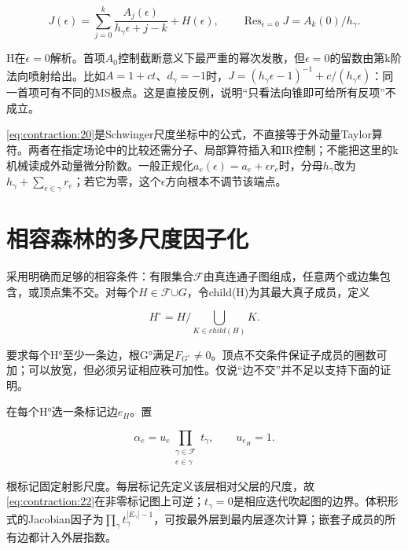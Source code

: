 \documentclass[11pt,a4paper,oneside]{ctexrep}
\theoremstyle{cnplain}
\theoremstyle{definition}
\theoremstyle{remark}
\begin{document}
\begin{equation}
J(\epsilon)=\sum_{j=0}^k\frac{A_j(\epsilon)}{h_\gamma\epsilon+j-k}
                  +H(\epsilon),\qquad
 \operatorname{Res}_{\epsilon=0}J=A_k(0)/h_\gamma.                \label{eq:contraction:20}
\end{equation}

H在\(\epsilon =0\)解析。首项\(A_0\)控制截断意义下最严重的幂次发散，但\(\epsilon =0\)的留数由第k阶法向喷射给出。比如\(A=1+c t\)、\(d_\gamma =- 1\)时，\(J=(h_\gamma \epsilon - 1)^{-1}+c/(h_\gamma \epsilon )\)：同一首项可有不同的MS极点。这是直接反例，说明``只看法向锥即可给所有反项''不成立。

\eqref{eq:contraction:20}是Schwinger尺度坐标中的公式，不直接等于外动量Taylor算符。两者在指定场论中的比较还需分子、局部算符插入和IR控制；不能把这里的k机械读成外动量微分阶数。一般正规化\(a_e(\epsilon )=a_e+\epsilon r_e\)时，分母\(h_\gamma \)改为\(h_\gamma +\sum _{e\in \gamma }r_e\)；若它为零，这个\(\epsilon \)方向根本不调节该端点。

\section{相容森林的多尺度因子化}\label{sec:contraction:6}

采用明确而足够的相容条件：有限集合\(\mathscr F\)由真连通子图组成，任意两个或边集包含，或顶点集不交。对每个\(H\in \)\(\mathscr F\)\(\cup {G}\)，令child(H)为其最大真子成员，定义

\begin{equation}
H^\circ=H/\bigcup_{K\in child(H)}K.      \label{eq:contraction:21}
\end{equation}

要求每个H°至少一条边，根G°满足\(F_{G^\circ}\ne 0\)。顶点不交条件保证子成员的圈数可加；可以放宽，但必须另证相应秩可加性。仅说``边不交''并不足以支持下面的证明。

在每个H°选一条标记边\(e_H\)。置

\begin{equation}
\alpha_e=u_e\prod_{\substack{\gamma\in\mathscr F\\e\in\gamma}}t_\gamma,
                  \qquad u_{e_H}=1.                             \label{eq:contraction:22}
\end{equation}

根标记固定射影尺度。每层标记先定义该层相对父层的尺度，故\eqref{eq:contraction:22}在非零标记图上可逆；\(t_\gamma =0\)是相应迭代吹起图的边界。体积形式的Jacobian因子为\(\prod _\gamma  t_\gamma ^{|E_\gamma |- 1}\)，可按最外层到最内层逐次计算；嵌套子成员的所有边都计入外层指数。
\end{document}
